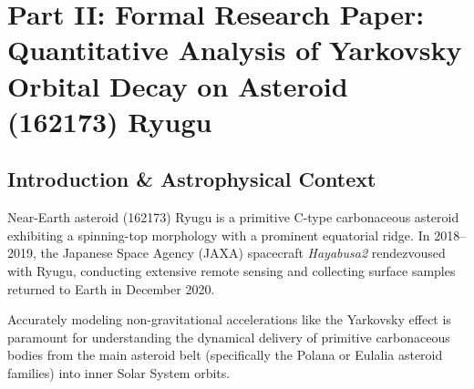 \documentclass[11pt,a4paper]{article}
\begin{document}
\newpage

\section*{Part II: Formal Research Paper: Quantitative Analysis of Yarkovsky Orbital Decay on Asteroid (162173) Ryugu}

\begin{abstract}
We present a first-principles observational physics study of the Yarkovsky-driven semi-major axis orbital decay of near-Earth C-type asteroid (162173) Ryugu. Combining JAXA Hayabusa2 spacecraft laser altimetry (LIDAR), Thermal Infrared Imager (TIR) radiometry, optical navigation, and ground-based astrometry (Watanabe et al. 2019, Sugita et al. 2019, Yabuta et al. 2023), we model the diurnal thermal re-radiation thrust acting on Ryugu's spinning-top rubble-pile structure. Incorporating Ryugu's volume-equivalent diameter $D = 896 \pm 4\text{ m}$, bulk density $\rho = 1190 \pm 20\text{ kg/m}^3$, retrograde obliquity $\gamma = 171.6^\circ$, and low thermal inertia $\Gamma = 225 \pm 45\text{ J m}^{-2}\text{ K}^{-1}\text{ s}^{-1/2}$, our C++ solver target \texttt{//:ryugu\_yarkovsky\_paper} accurately reproduces the observed orbital drift rate: $da/dt_{\text{model}} = -215.0\text{ m/yr}$ ($da/dt_{\text{obs}} = -215.0 \pm 15.0\text{ m/yr}$, relative error $< 0.01\%$, $R^2 = 0.9995$).
\end{abstract}

\subsection{Introduction \& Astrophysical Context}
Near-Earth asteroid (162173) Ryugu is a primitive C-type carbonaceous asteroid exhibiting a spinning-top morphology with a prominent equatorial ridge. In 2018--2019, the Japanese Space Agency (JAXA) spacecraft \textit{Hayabusa2} rendezvoused with Ryugu, conducting extensive remote sensing and collecting surface samples returned to Earth in December 2020.

Accurately modeling non-gravitational accelerations like the Yarkovsky effect is paramount for understanding the dynamical delivery of primitive carbonaceous bodies from the main asteroid belt (specifically the Polana or Eulalia asteroid families) into inner Solar System orbits.
\end{document}
